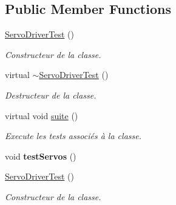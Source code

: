 \subsection*{Public Member Functions}
\begin{DoxyCompactItemize}
\item 
\mbox{\label{classtest_1_1ServoDriverTest_a7b7a1ae64677a490ae6dec098e39d243}} 
\hyperlink{classtest_1_1ServoDriverTest_a7b7a1ae64677a490ae6dec098e39d243}{Servo\+Driver\+Test} ()
\begin{DoxyCompactList}\small\item\em Constructeur de la classe. \end{DoxyCompactList}\item 
\mbox{\label{classtest_1_1ServoDriverTest_a50888741be5b2e7395ebe58e757851a7}} 
virtual \hyperlink{classtest_1_1ServoDriverTest_a50888741be5b2e7395ebe58e757851a7}{$\sim$\+Servo\+Driver\+Test} ()
\begin{DoxyCompactList}\small\item\em Destructeur de la classe. \end{DoxyCompactList}\item 
\mbox{\label{classtest_1_1ServoDriverTest_aac9a534519e12d020a10f286b3e192fe}} 
virtual void \hyperlink{classtest_1_1ServoDriverTest_aac9a534519e12d020a10f286b3e192fe}{suite} ()
\begin{DoxyCompactList}\small\item\em Execute les tests associés à la classe. \end{DoxyCompactList}\item 
\mbox{\label{classtest_1_1ServoDriverTest_a5b6452334b00fce778bc5ae87b579026}} 
void {\bfseries test\+Servos} ()
\item 
\mbox{\label{classtest_1_1ServoDriverTest_a7b7a1ae64677a490ae6dec098e39d243}} 
\hyperlink{classtest_1_1ServoDriverTest_a7b7a1ae64677a490ae6dec098e39d243}{Servo\+Driver\+Test} ()
\begin{DoxyCompactList}\small\item\em Constructeur de la classe. \end{DoxyCompactList}\item 

\end{DoxyCompactItemize}
